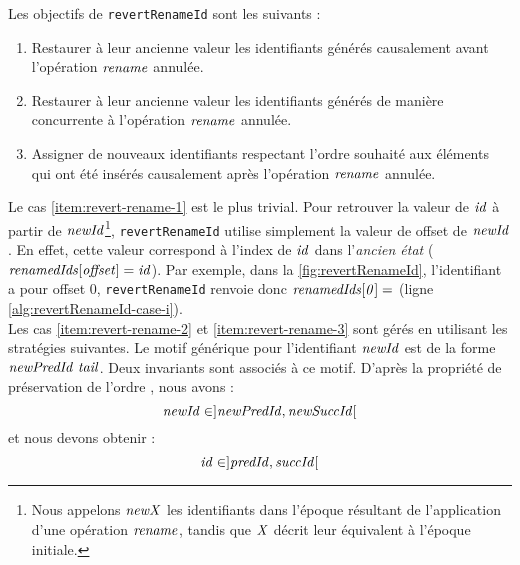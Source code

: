 Les objectifs de \texttt{revertRenameId} sont les suivants :
\begin{enumerate}
  \item \label{item:revert-rename-1}
    Restaurer à leur ancienne valeur les identifiants générés causalement avant l'opération $\mathit{rename}$ annulée.
  \item \label{item:revert-rename-2}
    Restaurer à leur ancienne valeur les identifiants générés de manière concurrente à l'opération $\mathit{rename}$ annulée.
  \item \label{item:revert-rename-3}
    Assigner de nouveaux identifiants respectant l'ordre souhaité aux éléments qui ont été insérés causalement après l'opération $\mathit{rename}$ annulée.
\end{enumerate}

Le cas \ref{item:revert-rename-1} est le plus trivial.
Pour retrouver la valeur de $\mathit{id}$ à partir de $\mathit{newId}$\footnote{Nous appelons $\mathit{newX}$ les identifiants dans l'époque résultant de l'application d'une opération $\mathit{rename}$, tandis que $\mathit{X}$ décrit leur équivalent à l'époque initiale.}, \texttt{revertRenameId} utilise simplement la valeur de offset de $\mathit{newId}$.
En effet, cette valeur correspond à l'index de $\mathit{id}$ dans l'\emph{ancien état} (\ie $\mathit{renamedIds[offset]} = \mathit{id}$).
Par exemple, dans la \autoref{fig:revertRenameId}, l'identifiant  a pour offset 0, \texttt{revertRenameId} renvoie donc $\mathit{renamedIds[0]} =$  (ligne \ref{alg:revertRenameId-case-i}).\\

Les cas \ref{item:revert-rename-2} et \ref{item:revert-rename-3} sont gérés en utilisant les stratégies suivantes.
Le motif générique pour l'identifiant $\mathit{newId}$ est de la forme $\mathit{newPredId~tail}$.
Deux invariants sont associés à ce motif.
D'après la propriété de préservation de l'ordre , nous avons :
\[\mathit{newId} \in ]\mathit{newPredId}, \mathit{newSuccId}[\]
et nous devons obtenir :
\[\mathit{id} \in ]\mathit{predId}, \mathit{succId}[\]

